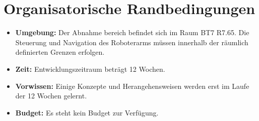 \section{Organisatorische Randbedingungen}
\begin{itemize}

    \item \textbf{Umgebung:}  
    Der Abnahme bereich befindet sich im Raum BT7 R7.65. Die Steuerung und Navigation des Roboterarms müssen innerhalb der räumlich definierten Grenzen erfolgen.
    \item \textbf{Zeit:} Entwicklungszeitraum beträgt 12 Wochen. 
    \item \textbf{Vorwissen:} Einige Konzepte und Herangehensweisen werden erst im Laufe der 12 Wochen gelernt.
    \item \textbf{Budget:} Es steht kein Budget zur Verfügung.

\end{itemize}

